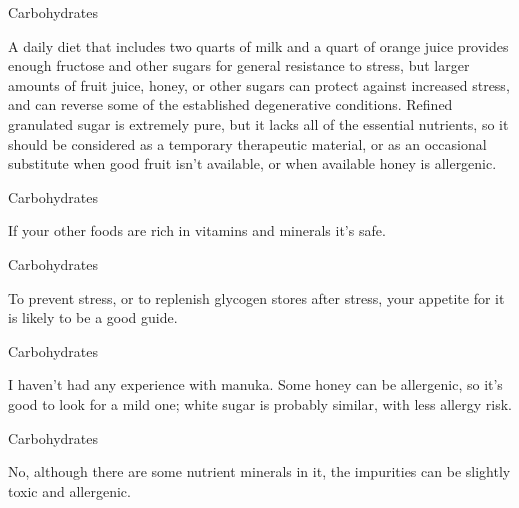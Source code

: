 \documentclass[11pt,oneside,openany,extrafontsizes]{memoir}
\begin{document}
\begin{standalonequote}{Carbohydrates}

    \begin{answer}
        A daily diet that includes two quarts of milk and a quart of orange juice provides enough fructose and other sugars for general resistance to stress, but larger amounts of fruit juice, honey, or other sugars can protect against increased stress, and can reverse some of the established degenerative conditions. Refined granulated sugar is extremely pure, but it lacks all of the essential nutrients, so it should be considered as a temporary therapeutic material, or as an occasional substitute when good fruit isn't available, or when available honey is allergenic.
    \end{answer}
\end{standalonequote}

\begin{standalonequote}{Carbohydrates}

    \begin{answer}
        If your other foods are rich in vitamins and minerals it's safe.
    \end{answer}
\end{standalonequote}

\begin{standalonequote}{Carbohydrates}

    \begin{answer}
        To prevent stress, or to replenish glycogen stores after stress, your appetite for it is likely to be a good guide.
    \end{answer}
\end{standalonequote}

\begin{standalonequote}{Carbohydrates}

    \begin{answer}
        I haven't had any experience with manuka. Some honey can be allergenic, so it's good to look for a mild one; white sugar is probably similar, with less allergy risk.
    \end{answer}
\end{standalonequote}

\begin{standalonequote}{Carbohydrates}

    \begin{answer}
        No, although there are some nutrient minerals in it, the impurities can be slightly toxic and allergenic.
    \end{answer}
\end{standalonequote}
\end{document}
